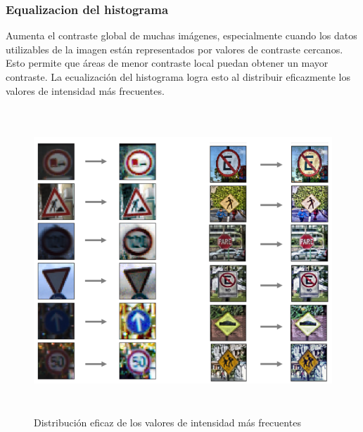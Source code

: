 		\vspace{1.5em}
		\subsubsection{Equalizacion del histograma}
			Aumenta el contraste global de muchas imágenes, especialmente cuando los datos utilizables de la imagen están representados por valores de contraste cercanos. Esto permite que áreas de menor contraste local puedan obtener un mayor contraste. La ecualización del histograma logra esto al distribuir eficazmente los valores de intensidad más frecuentes.

			\begin{figure}[H]
				\begin{center}
				\includegraphics[height=11.5cm]{images/desarrollo/Augment/equalize_hist2_wo_Norm_woRepetition2}
				\end{center}
				\begin{center}
				\caption{\small{Distribución eficaz de los valores de intensidad más frecuentes}}
				{\small{\fontsize{10}{16.8}\selectfont {Fuente: Elaboración propia}}}
				\end{center}
				\vspace{-1.5em}
			\end{figure}
		
		

